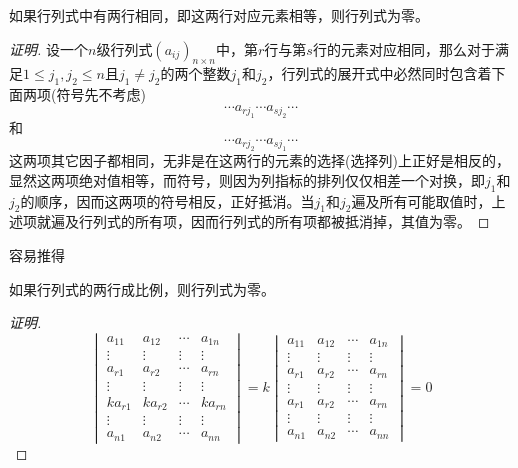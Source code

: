 \begin{property}
    如果行列式中有两行相同，即这两行对应元素相等，则行列式为零。
\end{property}

\begin{proof}[证明]
  设一个$n$级行列式$(a_{ij})_{n \times n}$中，第$r$行与第$s$行的元素对应相同，那么对于满足$1 \leqslant j_1,j_2 \leqslant n$且$j_1 \neq j_2$的两个整数$j_1$和$j_2$，行列式的展开式中必然同时包含着下面两项(符号先不考虑)
  \[ \cdots a_{rj_1} \cdots a_{sj_2} \cdots \]
  和
  \[ \cdots a_{rj_2} \cdots a_{sj_1} \cdots \]
 这两项其它因子都相同，无非是在这两行的元素的选择(选择列)上正好是相反的，显然这两项绝对值相等，而符号，则因为列指标的排列仅仅相差一个对换，即$j_1$和$j_2$的顺序，因而这两项的符号相反，正好抵消。当$j_1$和$j_2$遍及所有可能取值时，上述项就遍及行列式的所有项，因而行列式的所有项都被抵消掉，其值为零。
\end{proof}

容易推得
\begin{inference}
  如果行列式的两行成比例，则行列式为零。
\end{inference}

\begin{proof}[证明]
  \[
  \begin{vmatrix}
    a_{11} & a_{12} & \cdots & a_{1n} \\
    \vdots & \vdots & \vdots & \vdots \\
    a_{r1} & a_{r2} & \cdots & a_{rn} \\
    \vdots & \vdots & \vdots & \vdots \\
    ka_{r1} & ka_{r2} & \cdots & ka_{rn} \\
    \vdots & \vdots & \vdots & \vdots \\
    a_{n1} & a_{n2} & \cdots & a_{nn}
  \end{vmatrix}
  = k
  \begin{vmatrix}
    a_{11} & a_{12} & \cdots & a_{1n} \\
    \vdots & \vdots & \vdots & \vdots \\
    a_{r1} & a_{r2} & \cdots & a_{rn} \\
    \vdots & \vdots & \vdots & \vdots \\
    a_{r1} & a_{r2} & \cdots & a_{rn} \\
    \vdots & \vdots & \vdots & \vdots \\
    a_{n1} & a_{n2} & \cdots & a_{nn}
  \end{vmatrix}
   = 0
    \]
\end{proof}

